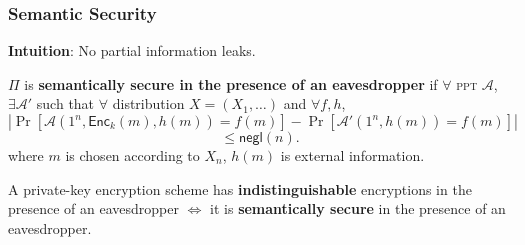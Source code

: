 \begin{frame}\frametitle{Semantic Security}
\textbf{Intuition}: No partial information leaks.
\begin{definition}
$\Pi$ is \textbf{semantically secure in the presence of an eavesdropper} if $\forall$ \textsc{ppt} $\mathcal{A}$, $\exists \mathcal{A'}$ such that $\forall$ distribution $X = (X_1, \dots)$ and $\forall f, h$,
\[ \left|\Pr[\mathcal{A}(1^n,\mathsf{Enc}_k(m),h(m))=f(m)]-\Pr[\mathcal{A}'(1^n,h(m))=f(m)]\right| 
\]
\[ \le \mathsf{negl}(n).
\]
where $m$ is chosen according to $X_n$, $h(m)$ is external information.
\end{definition}
\begin{theorem}
A private-key encryption scheme has \textbf{indistinguishable} encryptions in the presence of an eavesdropper $\iff$ it is \textbf{semantically secure} in the presence of an eavesdropper.
\end{theorem}
\end{frame}
